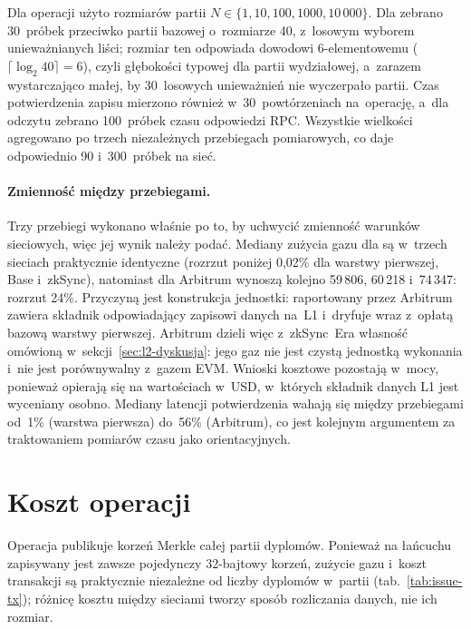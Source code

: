 Dla operacji  użyto rozmiarów partii $N \in \{1, 10, 100,
1000, 10\,000\}$. Dla  zebrano 30~próbek przeciwko partii
bazowej o~rozmiarze 40, z~losowym wyborem unieważnianych liści; rozmiar ten
odpowiada dowodowi 6-elementowemu ($\lceil \log_2 40 \rceil = 6$), czyli
głębokości typowej dla partii wydziałowej, a~zarazem wystarczająco małej, by
30~losowych unieważnień nie wyczerpało partii. Czas potwierdzenia zapisu mierzono
również w~30~powtórzeniach na~operację, a~dla odczytu 
zebrano 100~próbek czasu odpowiedzi RPC. Wszystkie wielkości agregowano po trzech
niezależnych przebiegach pomiarowych, co daje odpowiednio 90 i~300~próbek na
sieć.

\paragraph{Zmienność między przebiegami.} Trzy przebiegi wykonano właśnie po to,
by uchwycić zmienność warunków sieciowych, więc jej wynik należy podać. Mediany
zużycia gazu dla  są w~trzech sieciach praktycznie
identyczne (rozrzut poniżej 0{,}02\% dla warstwy pierwszej, Base i~zkSync),
natomiast dla Arbitrum wynoszą kolejno 59\,806, 60\,218 i~74\,347: rozrzut
24\%. Przyczyną jest konstrukcja jednostki:  raportowany przez
Arbitrum zawiera składnik odpowiadający zapisowi danych na~L1 i~dryfuje wraz
z~opłatą bazową warstwy pierwszej. Arbitrum dzieli więc z~zkSync~Era własność
omówioną w~sekcji~\ref{sec:l2-dyskusja}: jego gaz nie jest czystą jednostką
wykonania i~nie jest porównywalny z~gazem EVM. Wnioski kosztowe pozostają w~mocy,
ponieważ opierają się na wartościach w~USD, w~których składnik danych L1 jest
wyceniany osobno. Mediany latencji potwierdzenia wahają się między przebiegami
od~1\% (warstwa pierwsza) do~56\% (Arbitrum), co jest kolejnym argumentem za
traktowaniem pomiarów czasu jako orientacyjnych.

\section{Koszt operacji }
\label{sec:l2-issue}

Operacja  publikuje korzeń Merkle całej partii dyplomów.
Ponieważ na łańcuchu zapisywany jest zawsze pojedynczy 32-bajtowy korzeń, zużycie
gazu i~koszt transakcji są praktycznie niezależne od liczby dyplomów w~partii
(tab.~\ref{tab:issue-tx}); różnicę kosztu między sieciami tworzy sposób
rozliczania danych, nie ich rozmiar.


